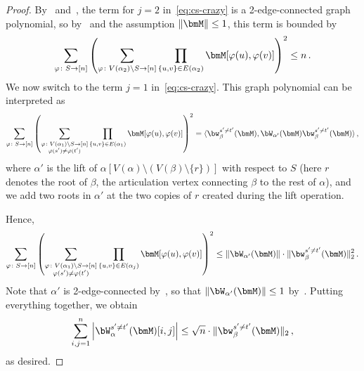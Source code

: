 \begin{proof}
By~ and~, the term
for $j = 2$ in~\cref{eq:cs-crazy} is a 2-edge-connected
graph polynomial, so by~ and the assumption $\|\bmM\|\le 1$, this term is bounded by
\[
    \sum_{\varphi\colon S \to [n]} \left(  \sum_{\substack{\varphi \colon V(\alpha_2)\setminus S\to  [n]}} \prod_{\{u,v\}\in E(\alpha_2)} \bmM[\varphi(u),\varphi(v)]\right)^2\le n\,.
\]
We now switch to the term $j = 1$ in~\cref{eq:cs-crazy}. This graph polynomial
can be interpreted as
\[
    \sum_{\varphi\colon S \to [n]} \left(  \sum_{\substack{\varphi \colon V(\alpha_1)\setminus S \to [n]\\\varphi(s')\neq \varphi(t')}} \prod_{\{u,v\}\in E(\alpha_1)} \bmM[\varphi(u),\varphi(v)]\right)^2 = \langle \bw_\beta^{s'\neq t'}(\bmM), \bW_{\alpha'}(\bmM) \bw_\beta^{s'\neq t'}(\bmM)\rangle\,,
\]
where $\alpha'$ is the lift of 
$\alpha\left[V(\alpha)\setminus (V(\beta)\setminus \{r\})\right]$
with respect to $S$ (here $r$ denotes the root of $\beta$, the articulation vertex connecting $\beta$ to the rest of $\alpha$),
and we add two roots in $\alpha'$ at the two
copies of $r$ created during the lift operation.

Hence,
\[
    \sum_{\varphi\colon S \to [n]} \left(  \sum_{\substack{\varphi \colon V(\alpha_1)\setminus S\to [n]\\\varphi(s')\neq \varphi(t')}} \prod_{\{u,v\}\in E(\alpha_j)} \bmM[\varphi(u),\varphi(v)]\right)^2 \le \|\bW_{\alpha'}(\bmM)\| \cdot \|\bw_\beta^{s'\neq t'}(\bmM)\|_2^2 \,.
\]
Note that $\alpha'$ is 2-edge-connected by~, so that $ \|\bW_{\alpha'}(\bmM)\|\le 1$ by~. Putting everything together, we obtain
\[
    \sum_{i,j=1}^n \left|\bW_\alpha^{s'\neq t'}(\bmM)[i,j]\right|\le \sqrt n \cdot \|\bw_\beta^{s'\neq t'}(\bmM)\|_2\,,
\]
as desired.
\end{proof}

